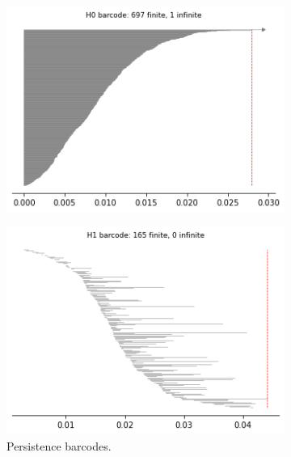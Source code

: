 \begin{figure}[H]
\begin{subfigure}[b]{0.25\textwidth}
\end{subfigure}
\begin{subfigure}[b]{0.24\textwidth}
    \includegraphics[width=\textwidth]{figures/topology/X2_H0_barcode.png}
    \caption{}
\end{subfigure}
\begin{subfigure}[b]{0.24\textwidth}
    \includegraphics[width=\textwidth]{figures/topology/X2_H1_barcode.png}
        \caption{Persistence barcodes.}
\end{subfigure}
\begin{subfigure}[b]{0.24\textwidth}

\end{subfigure}
\end{figure}

